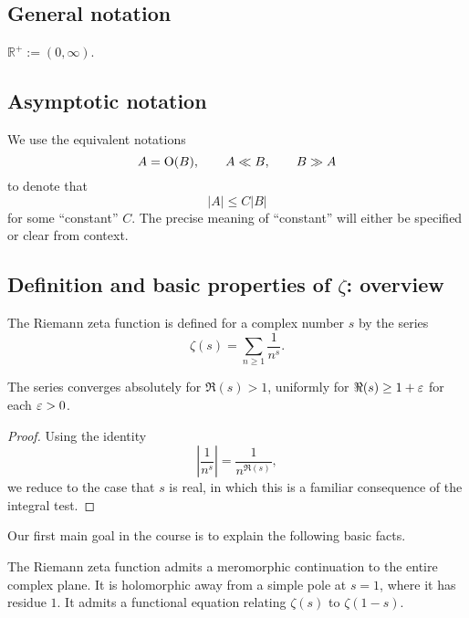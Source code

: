 \documentclass[reqno]{amsart}  \numberwithin{theorem}{section} \numberwithin{equation}{section}
\begin{document}
\subsection{General notation}
$\mathbb{R}^+ := (0,\infty)$.

\subsection{Asymptotic notation}
We use the equivalent notations
\begin{equation*}
  A = \operatorname{O}(B), \qquad A \ll B,
  \qquad B \gg A
\end{equation*}
to denote that
\begin{equation*}
  \lvert A \rvert \leq C \lvert B \rvert
\end{equation*}
for some ``constant'' $C$.  The precise meaning of ``constant'' will either be specified or clear from context.


\newpage
\subsection{Definition and basic properties of $\zeta$: overview}
The Riemann zeta function is defined for a complex number $s$ by the series
\begin{equation*}
  \zeta (s) = \sum_{n \geq 1} \frac{1}{n^s }.
\end{equation*}
\begin{lemma}
  The series converges absolutely for $\Re(s) > 1$, uniformly for $\Re(s) \geq 1 + \varepsilon$ for each $\varepsilon > 0$.
\end{lemma}
\begin{proof}
  Using the identity
  \begin{equation*}
    \left\lvert \frac{1}{n^s} \right\rvert = \frac{1}{n^{\Re(s)}},
  \end{equation*}
  we reduce to the case that $s$ is real, in which this is a familiar consequence of the integral test.
\end{proof}

Our first main goal in the course is to explain the following basic facts.
\begin{theorem}
  The Riemann zeta function admits a meromorphic continuation to the entire complex plane.  It is holomorphic away from a simple pole at $s = 1$, where it has residue $1$.  It admits a functional equation relating $\zeta (s)$ to $\zeta (1-s)$.
\end{theorem}
\end{document}
